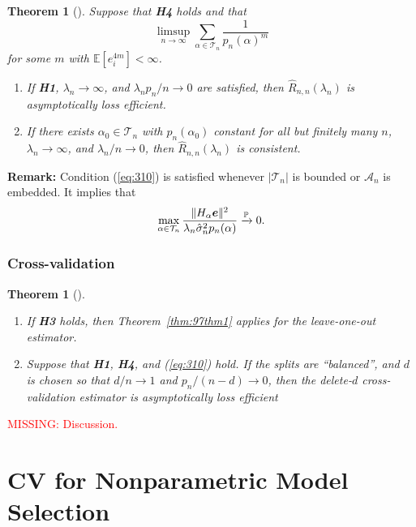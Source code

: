 \documentclass[12pt, letter paper]{article}
\newcommand{\1}{\mathmybb{1}}
\newtheorem{theorem}[proposition]{Theorem}
\newcommand{\0}{\emptyset}
\newcommand{\prob}{\mathbb{P}}
\newcommand{\Ep}[1]{\mathbb{E}\left[ #1 \right]}
\newcommand{\paren}[1]{\left(#1 \right)}
\newcommand{\norm}[1]{|\hspace{-1pt}|#1 |\hspace{-1pt}|}
\newcommand{\normsq}[1]{\norm{#1}^{2}}
\newcommand{\Acal}{\mathcal{A}_{n}}
\newcommand{\Tcal}{\mathcal{T}_{n}}
\newcommand{\e}{\boldsymbol{e}}
\newcommand{\Rhat}[2]{\hat{R}_{n, #1}\paren{#2}}
\newcommand{\sigmahat}{\hat{\sigma}^{2}_{n}}
\begin{document}
\begin{theorem}[\cite{shao_1997}]\label{thm:97thm2}
    Suppose that \textbf{H4} holds and that
    \begin{equation}\label{eq:310}
        \limsup_{n\to\infty}\sum_{\alpha\in\Tcal}\frac{1}{p_{n}{(\alpha)}^{m}}
    \end{equation}
    for some \(m\) with \(\Ep{e_{i}^{4m}}<\infty\).
    \begin{enumerate}
        \item If \textbf{H1}, \(\lambda_{n}\to\infty\), and \(\lambda_{n}p_{n}/n \to 0\) are satisfied, then \(\Rhat{n}{\lambda_{n}}\) is asymptotically loss efficient.
        \item If there exists \(\alpha_{0}\in\Tcal\) with \(p_{n}(\alpha_{0})\) constant for all but finitely many \(n\), \(\lambda_{n}\to\infty\), and \(\lambda_{n}/n\to 0\), then \(\Rhat{n}{\lambda_{n}}\) is consistent. 
    \end{enumerate}
\end{theorem}

\textbf{Remark:} Condition (\ref{eq:310}) is satisfied whenever \(|\Tcal|\) is bounded or \(\Acal\) is embedded. It implies that 
\[ \max_{\alpha\in\Tcal} \frac{\normsq{H_{\alpha}\e}}{\lambda_{n}\sigmahat p_{n}(\alpha)}\xrightarrow{\prob} 0.\]

\subsubsection{Cross-validation}

\begin{theorem}[\cite{shao_1997}]\label{thm:97thm45}
    \begin{enumerate}
        \item If \textbf{H3} holds, then Theorem~\ref{thm:97thm1} applies for the leave-one-out estimator.
        \item Suppose that \textbf{H1}, \textbf{H4}, and (\ref{eq:310}) hold. If the splits are ``balanced'', and \(d\) is chosen so that \(d/n\to1\) and \(p_n/(n-d) \to 0\), then the delete-\(d\) cross-validation estimator is asymptotically loss efficient 
    \end{enumerate}
\end{theorem}

\textcolor{red}{MISSING: Discussion.}


\section{CV for Nonparametric Model Selection}
\end{document}
